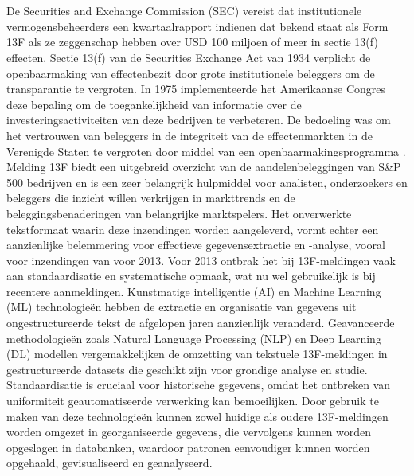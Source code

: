 \chapter{}%
\label{ch:stand-van-zaken}





De Securities and Exchange Commission (SEC) vereist dat institutionele vermogensbeheerders een kwartaalrapport indienen dat bekend staat als Form 13F als ze zeggenschap hebben over USD 100 miljoen of meer in sectie 13(f) effecten. Sectie 13(f) van de Securities Exchange Act van 1934 verplicht de openbaarmaking van effectenbezit door grote institutionele beleggers om de transparantie te vergroten. In 1975 implementeerde het Amerikaanse Congres deze bepaling om de toegankelijkheid van informatie over de investeringsactiviteiten van deze bedrijven te verbeteren. De bedoeling was om het vertrouwen van beleggers in de integriteit van de effectenmarkten in de Verenigde Staten te vergroten door middel van een openbaarmakingsprogramma \textcite{SECform13F2024}.
Melding 13F biedt een uitgebreid overzicht van de aandelenbeleggingen van S\&P 500 bedrijven en is een zeer belangrijk hulpmiddel voor analisten, onderzoekers en beleggers die inzicht willen verkrijgen in markttrends en de beleggingsbenaderingen van belangrijke marktspelers. Het onverwerkte tekstformaat waarin deze inzendingen worden aangeleverd, vormt echter een aanzienlijke belemmering voor effectieve gegevensextractie en -analyse, vooral voor inzendingen van voor 2013. Voor 2013 ontbrak het bij 13F-meldingen vaak aan standaardisatie en systematische opmaak, wat nu wel gebruikelijk is bij recentere aanmeldingen.
Kunstmatige intelligentie (AI) en Machine Learning (ML) technologieën hebben de extractie en organisatie van gegevens uit ongestructureerde tekst de afgelopen jaren aanzienlijk veranderd. Geavanceerde methodologieën zoals Natural Language Processing (NLP) en Deep Learning (DL) modellen vergemakkelijken de omzetting van tekstuele 13F-meldingen in gestructureerde datasets die geschikt zijn voor grondige analyse en studie. Standaardisatie is cruciaal voor historische gegevens, omdat het ontbreken van uniformiteit geautomatiseerde verwerking kan bemoeilijken. Door gebruik te maken van deze technologieën kunnen zowel huidige als oudere 13F-meldingen worden omgezet in georganiseerde gegevens, die vervolgens kunnen worden opgeslagen in databanken, waardoor patronen eenvoudiger kunnen worden opgehaald, gevisualiseerd en geanalyseerd.

